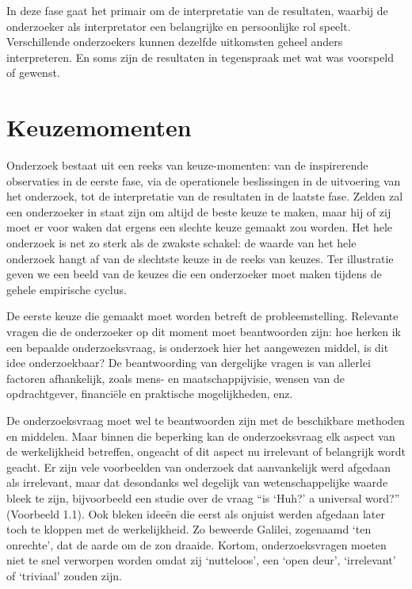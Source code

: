 \documentclass[
]{book}
\begin{document}
In deze fase gaat het primair om de interpretatie van de resultaten,
waarbij de onderzoeker als interpretator een belangrijke en persoonlijke
rol speelt. Verschillende onderzoekers kunnen dezelfde uitkomsten geheel
anders interpreteren. En soms zijn de resultaten in tegenspraak met wat
was voorspeld of gewenst.

\hypertarget{sec:keuzemomenten}{%
\section{Keuzemomenten}\label{sec:keuzemomenten}}

Onderzoek bestaat uit een reeks van keuze-momenten: van de inspirerende
observaties in de eerste fase, via de operationele beslissingen in de
uitvoering van het onderzoek, tot de interpretatie van de resultaten in
de laatste fase. Zelden zal een onderzoeker in staat zijn om altijd de
beste keuze te maken, maar hij of zij moet er voor waken dat ergens een
slechte keuze gemaakt zou worden. Het hele onderzoek is net zo sterk als
de zwakste schakel: de waarde van het hele onderzoek hangt af van de
slechtste keuze in de reeks van keuzes. Ter illustratie geven we een
beeld van de keuzes die een onderzoeker moet maken tijdens de gehele
empirische cyclus.

De eerste keuze die gemaakt moet worden betreft de probleemstelling.
Relevante vragen die de onderzoeker op dit moment moet beantwoorden
zijn: hoe herken ik een bepaalde onderzoeksvraag, is onderzoek hier het
aangewezen middel, is dit idee onderzoekbaar? De beantwoording van
dergelijke vragen is van allerlei factoren afhankelijk, zoals mens- en
maatschappijvisie, wensen van de opdrachtgever, financiële en praktische
mogelijkheden, enz.

De onderzoeksvraag moet wel te beantwoorden zijn met de beschikbare
methoden en middelen. Maar binnen die beperking kan de onderzoeksvraag
elk aspect van de werkelijkheid betreffen, ongeacht of dit aspect nu
irrelevant of belangrijk wordt geacht. Er zijn vele voorbeelden van
onderzoek dat aanvankelijk werd afgedaan als irrelevant, maar dat
desondanks wel degelijk van wetenschappelijke waarde bleek te zijn,
bijvoorbeeld een studie over de vraag ``is `Huh?' a universal word?''
\citep{DTE13} (Voorbeeld 1.1).
Ook bleken ideeën die eerst als onjuist werden afgedaan later toch te kloppen met de werkelijkheid. Zo beweerde Galilei, zogenaamd `ten onrechte', dat de aarde om de zon draaide. Kortom, onderzoeksvragen moeten niet te snel verworpen worden omdat zij `nutteloos', een `open deur', `irrelevant' of `triviaal' zouden zijn.
\end{document}
